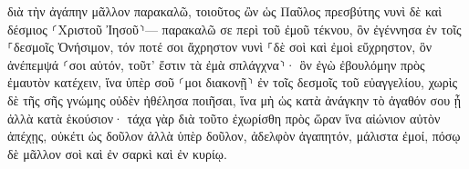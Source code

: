 \documentclass{openreader}
\begin{document}
διὰ τὴν ἀγάπην μᾶλλον παρακαλῶ, τοιοῦτος ὢν ὡς Παῦλος πρεσβύτης νυνὶ δὲ καὶ δέσμιος ⸂Χριστοῦ Ἰησοῦ⸃— 
παρακαλῶ σε περὶ τοῦ ἐμοῦ τέκνου, ὃν ἐγέννησα ἐν τοῖς ⸀δεσμοῖς Ὀνήσιμον, 
τόν ποτέ σοι ἄχρηστον νυνὶ ⸀δὲ σοὶ καὶ ἐμοὶ εὔχρηστον, 
ὃν ἀνέπεμψά ⸂σοι αὐτόν, τοῦτ’ ἔστιν τὰ ἐμὰ σπλάγχνα⸃· 
ὃν ἐγὼ ἐβουλόμην πρὸς ἐμαυτὸν κατέχειν, ἵνα ὑπὲρ σοῦ ⸂μοι διακονῇ⸃ ἐν τοῖς δεσμοῖς τοῦ εὐαγγελίου, 
χωρὶς δὲ τῆς σῆς γνώμης οὐδὲν ἠθέλησα ποιῆσαι, ἵνα μὴ ὡς κατὰ ἀνάγκην τὸ ἀγαθόν σου ᾖ ἀλλὰ κατὰ ἑκούσιον· 
τάχα γὰρ διὰ τοῦτο ἐχωρίσθη πρὸς ὥραν ἵνα αἰώνιον αὐτὸν ἀπέχῃς, 
οὐκέτι ὡς δοῦλον ἀλλὰ ὑπὲρ δοῦλον, ἀδελφὸν ἀγαπητόν, μάλιστα ἐμοί, πόσῳ δὲ μᾶλλον σοὶ καὶ ἐν σαρκὶ καὶ ἐν κυρίῳ. 
\end{document}
